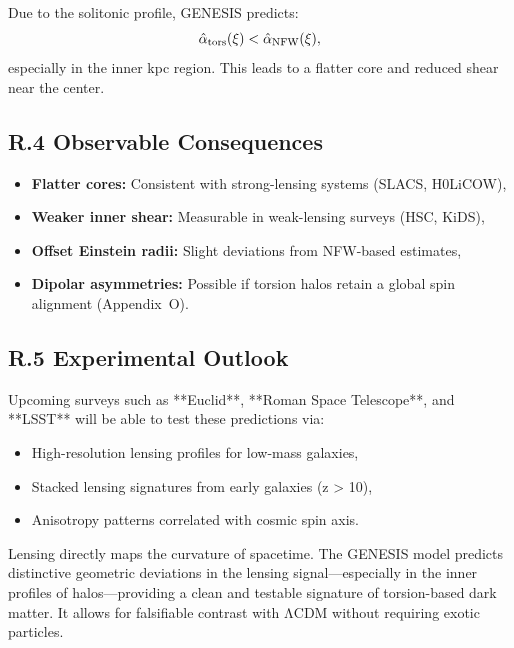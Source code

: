 \documentclass{article}
\begin{document}
Due to the solitonic profile, GENESIS predicts:
\begin{equation}
\hat{\alpha}_{\rm tors}(\xi) < \hat{\alpha}_{\rm NFW}(\xi),
\end{equation}
especially in the inner kpc region. This leads to a flatter core and reduced shear near the center.

\subsection*{R.4 Observable Consequences}
\begin{itemize}
  \item \textbf{Flatter cores:} Consistent with strong-lensing systems (SLACS, H0LiCOW),
  \item \textbf{Weaker inner shear:} Measurable in weak-lensing surveys (HSC, KiDS),
  \item \textbf{Offset Einstein radii:} Slight deviations from NFW-based estimates,
  \item \textbf{Dipolar asymmetries:} Possible if torsion halos retain a global spin alignment (Appendix~O).
\end{itemize}

\subsection*{R.5 Experimental Outlook}
Upcoming surveys such as **Euclid**, **Roman Space Telescope**, and **LSST** will be able to test these predictions via:
\begin{itemize}
  \item High-resolution lensing profiles for low-mass galaxies,
  \item Stacked lensing signatures from early galaxies (z > 10),
  \item Anisotropy patterns correlated with cosmic spin axis.
\end{itemize}

\begin{tcolorbox}[colback=gray!5, colframe=black!30, title=Why this matters]
Lensing directly maps the curvature of spacetime. The GENESIS model predicts distinctive geometric deviations in the lensing signal—especially in the inner profiles of halos—providing a clean and testable signature of torsion-based dark matter. It allows for falsifiable contrast with ΛCDM without requiring exotic particles.
\end{tcolorbox}
\end{document}
